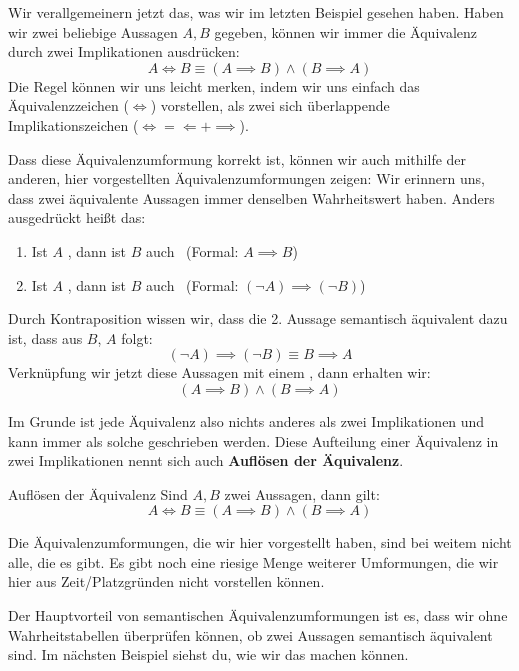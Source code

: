 \documentclass[../../main.tex]{subfiles}
\begin{document}
    Wir verallgemeinern jetzt das, was wir im letzten Beispiel gesehen haben.
     Haben wir zwei beliebige Aussagen $A,B$ gegeben, können wir immer die Äquivalenz
     durch zwei Implikationen ausdrücken:
    \[A \iff B \equiv (A \implies B) \land (B \implies A)\]
    Die Regel können wir uns leicht merken, indem wir uns einfach das Äquivalenzzeichen
    ($\iff$) vorstellen, als zwei sich überlappende Implikationszeichen ($\iff = \Longleftarrow + \implies$).

    Dass diese Äquivalenzumformung korrekt ist, können wir auch mithilfe der anderen, hier vorgestellten Äquivalenzumformungen 
    zeigen: Wir erinnern uns, dass zwei äquivalente Aussagen 
    immer denselben Wahrheitswert haben. Anders ausgedrückt heißt das:
    \begin{enumerate}
        \item Ist $A$ \wahr, dann ist $B$ auch \wahr\  (Formal: $A \implies B$)
        \item Ist $A$ \falsch, dann ist $B$ auch \falsch\  (Formal: $(\lnot A) \implies (\lnot B)$)
    \end{enumerate}
    Durch Kontraposition wissen wir, dass die 2. Aussage semantisch äquivalent dazu ist,
    dass aus $B$, $A$ folgt:
    \[(\lnot A) \implies (\lnot B) \equiv B \implies A\]
    Verknüpfung wir jetzt diese Aussagen mit einem , dann erhalten wir:
    \[(A \implies B) \land (B \implies A)\]
    
    Im Grunde ist jede Äquivalenz also nichts anderes als zwei Implikationen und kann immer als solche geschrieben werden. 
    Diese Aufteilung einer Äquivalenz in zwei Implikationen nennt sich auch \textbf{Auflösen der Äquivalenz}.
    
    \begin{theorem}{Auflösen der Äquivalenz}
    Sind $A,B$ zwei Aussagen, dann gilt:
        \[ A \iff B \equiv (A \implies B) \land (B \implies A)\]
    \end{theorem}

    Die Äquivalenzumformungen, die wir hier vorgestellt haben, sind bei weitem nicht alle, die es gibt. Es gibt
    noch eine riesige Menge weiterer Umformungen, die wir hier aus Zeit/Platzgründen nicht vorstellen können.
    
    Der Hauptvorteil von semantischen Äquivalenzumformungen ist es, dass wir ohne
    Wahrheitstabellen überprüfen können, ob zwei Aussagen semantisch äquivalent sind. 
    Im nächsten Beispiel siehst du, wie wir das machen können.
\end{document}

